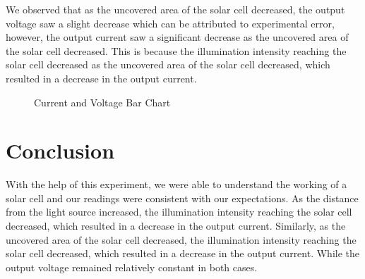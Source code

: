 \documentclass[a4paper, 12pt, english]{article}
\begin{document}
We observed that as the uncovered area of the solar cell decreased, the output
voltage saw a slight decrease which can be attributed to experimental error,
however, the output current saw a significant decrease as the uncovered area of
the solar cell decreased. This is because the illumination intensity reaching
the solar cell decreased as the uncovered area of the solar cell decreased,
which resulted in a decrease in the output current.

\begin{figure}[H]
	\centering
	\caption{Current and Voltage Bar Chart}
\end{figure}

\section{Conclusion}
With the help of this experiment, we were able to understand the working of a
solar cell and our readings were consistent with our expectations. As the
distance from the light source increased, the illumination intensity reaching
the solar cell decreased, which resulted in a decrease in the output current.
Similarly, as the uncovered area of the solar cell decreased, the illumination
intensity reaching the solar cell decreased, which resulted in a decrease in
the output current. While the output voltage remained relatively constant in
both cases.
\end{document}
